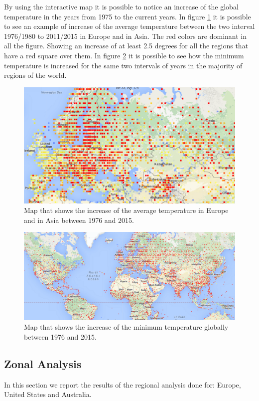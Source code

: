 \documentclass{vldb}
\begin{document}
By using the interactive map it is possible to notice an increase of the global temperature in the years from 1975 to the current years. In figure \ref{img:increaseMap} it is possible to see an example of increase of the average temperature between the two interval 1976/1980 to 2011/2015 in Europe and in Asia. The red colors are dominant in all the figure. Showing an increase of at least 2.5 degrees for all the regions that have a red square over them.
In figure \ref{img:increaseGlobal} it is possible to see how the minimum temperature is increased for the same two intervals of years in the majority of regions of the world.

\begin{figure}[tbh]
\includegraphics[width=1\linewidth]{increaseEurope}
\caption{Map that shows the increase of the average temperature in Europe and in Asia between 1976 and 2015.}
\label{img:increaseMap}
\end{figure}

\begin{figure}[tbh]
\includegraphics[width=1\linewidth]{increaseGlobal}
\caption{Map that shows the increase of the minimum temperature globally between 1976 and 2015.}
\label{img:increaseGlobal}
\end{figure}

\subsection{Zonal Analysis}
In this section we report the results of the regional analysis done for: Europe, United States and Australia.
\end{document}
